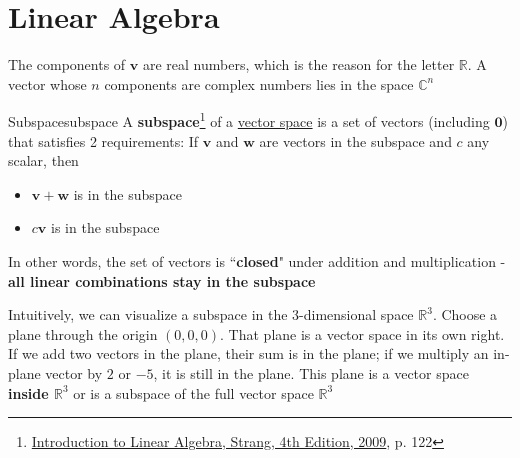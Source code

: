 \section{Linear Algebra}


The components of $\boldsymbol{v}$ are real numbers, which is the reason for the letter $\mathbb{R}$. A vector whose $n$
components are complex numbers lies in the space $\mathbb{C}^n$

\begin{Definition}{Subspace}{subspace}
    A \textbf{subspace}\footnote{\href{https://trello.com/c/qHJeDNkU}{Introduction to Linear Algebra, Strang, 4th Edition, 2009}, p. 122}
    of a \hyperlink{vector-space}{vector space} is a set of vectors (including $\boldsymbol{0}$) that satisfies 2
    requirements: If $\boldsymbol{v}$ and $\boldsymbol{w}$ are vectors in the subspace and $c$ any scalar, then

    \begin{itemize}
        \item $\boldsymbol{v} + \boldsymbol{w}$ is in the subspace
        \item $c\boldsymbol{v}$ is in the subspace
    \end{itemize}

    In other words, the set of vectors is ``\textbf{closed}" under addition and multiplication - \textbf{all linear combinations
    stay in the subspace}

\end{Definition}

Intuitively, we can visualize a subspace in the 3-dimensional space $\mathbb{R}^3$. Choose a plane through the
origin $(0, 0, 0)$. That plane is a vector space in its own right. If we add two vectors in the plane, their sum is in
the plane; if we multiply an in-plane vector by $2$ or $-5$, it is still in the plane. This plane is a vector space
\textbf{inside $\mathbb{R}^3$} or is a subspace of the full vector space $\mathbb{R}^3$


